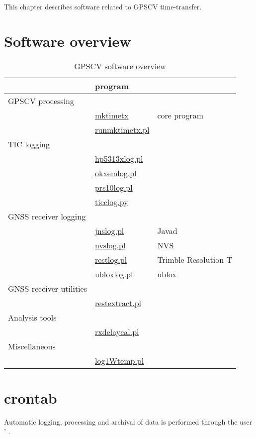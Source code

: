 
This chapter describes software related to GPSCV time-transfer.

\section{Software overview}


\begin{table}[h]
\begin{tabular}{l|l|l}
	& program & \\ 
	\hline
GPSCV processing  &  & \\
	& \hyperlink{h:mktimetx}{mktimetx} & core program\\
	& \hyperlink{h:runmktimetx}{runmktimetx.pl} & \\
	\hline
TIC logging & & \\
	& \hyperlink{h:hp5313xlog}{hp5313xlog.pl} &\\
	& \hyperlink{h:okxemlog}{okxemlog.pl} & \\
	& \hyperlink{h:prs10log}{prs10log.pl} & \\
	& \hyperlink{h:ticclog}{ticclog.py} & \\
	\hline
GNSS receiver logging & & \\
	&	\hyperlink{h:jnslog}{jnslog.pl} & Javad\\
	& \hyperlink{h:nvslog}{nvslog.pl} & NVS\\
	& \hyperlink{h:restlog}{restlog.pl} & Trimble Resolution T\\
	& \hyperlink{h:ubloxlog}{ubloxlog.pl} & ublox\\
GNSS receiver utilities & & \\
	& \hyperlink{h:restextract}{restextract.pl} & \\
	\hline
Analysis tools & & \\
	& \hyperlink{h:rxdelaycal}{rxdelaycal.pl} & \\
Miscellaneous & & \\
  & \hyperlink{h:log1Wtemp}{log1Wtemp.pl} & \\ 
	\hline
\end{tabular}
\caption{GPSCV software overview}
\end{table}

\section{crontab}

Automatic logging, processing and archival of data is performed through the user ' .

